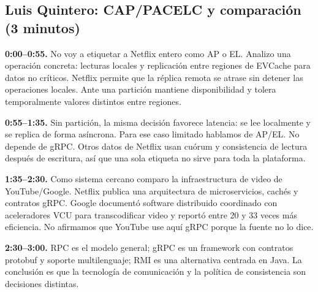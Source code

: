 \subsection*{Luis Quintero: CAP/PACELC y comparación (3 minutos)}

\textbf{0:00--0:55.} No voy a etiquetar a Netflix entero como AP o EL. Analizo
una operación concreta: lecturas locales y replicación entre regiones de
EVCache para datos no críticos. Netflix permite que la réplica remota se atrase
sin detener las operaciones locales. Ante una partición mantiene disponibilidad
y tolera temporalmente valores distintos entre regiones.

\textbf{0:55--1:35.} Sin partición, la misma decisión favorece latencia: se lee
localmente y se replica de forma asíncrona. Para ese caso limitado hablamos de
AP/EL. No depende de gRPC. Otros datos de Netflix usan cuórum y consistencia de
lectura después de escritura, así que una sola etiqueta no sirve para toda la
plataforma.

\textbf{1:35--2:30.} Como sistema cercano comparo la infraestructura de video
de YouTube/Google. Netflix publica una arquitectura de microservicios, cachés y
contratos gRPC. Google documentó software distribuido coordinado con
aceleradores VCU para transcodificar video y reportó entre 20 y 33 veces más
eficiencia. No afirmamos que YouTube use aquí gRPC porque la fuente no lo dice.

\textbf{2:30--3:00.} RPC es el modelo general; gRPC es un framework con
contratos protobuf y soporte multilenguaje; RMI es una alternativa centrada en
Java. La conclusión es que la tecnología de comunicación y la política de
consistencia son decisiones distintas.

